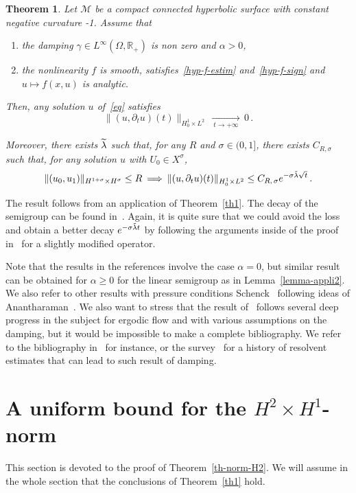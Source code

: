 \documentclass[10pt]{amsart}
\newtheorem{theo}{Theorem}[section]
\theoremstyle{definition}\newtheorem{defi}[theo]{Definition}\newtheorem{rema}[theo]{Remark}\newtheorem{exam}[theo]{Example}\newtheorem{exem}[theo]{Example}\newtheorem{nota}[theo]{Notation}
\newcommand{\RR}{\mathbb{R}}
\newcommand*{\alphenumi}{\renewcommand*{\theenumi}{\alph{enumi}}}
\let\oldtilde\tilde
\renewcommand*{\tilde}[1]{\mathchoice{\widetilde{#1}}{\widetilde{#1}}{\oldtilde{#1}}{\oldtilde{#1}}}\let\oldexists\exists
\renewcommand*{\exists}{\mathrel{\oldexists}}
\begin{document}
\begin{theo}\label{th-appli5}
Let $\mathcal{M}$ be a compact connected hyperbolic surface with constant negative curvature -1. Assume that
\begin{enumerate}\alphenumi
\item \label{listtheo12.1.1}the damping $\gamma\in L^\infty(\Omega,\RR_+)$ is non zero and $\alpha>0$,
\item \label{listtheo12.1.2}the nonlinearity $f$ is smooth, satisfies~\eqref{hyp-f-estim} and~\eqref{hyp-f-sign} and $u\mapsto f(x,u)$ is analytic.
\end{enumerate}

Then, any solution $u$ of~\eqref{eq} satisfies
\[
\|(u,\partial_t u)(t)\|_{H^1_0\times L^2}\,\xrightarrow[\:t\longrightarrow
+\infty\:]{}\,0\,.
\]

Moreover, there exists $\tilde\lambda$ such that, for any $R$ and $\sigma\in (0,1]$, there exists $C_{R,\sigma}$ such that, for any solution $u$ with $U_0\in X^\sigma$,
\[
\|(u_0,u_1)\|_{H^{1+\sigma}\times H^\sigma}\leq
R\:\Longrightarrow\:\|(u,\partial_t u)(t)\|_{H^1_0\times L^2} \leq
C_{R,\,\sigma}e^{-\sigma\tilde \lambda\sqrt{t}}\,.
\]
\end{theo}

The result follows from an application of Theorem~\ref{th1}. The decay of the semigroup can be found in~\cite{Lin}. Again, it is quite sure that we could avoid the loss and obtain a better decay $e^{-\sigma\tilde \lambda t}$ by following the arguments inside of the proof in~\cite{Lin} for a slightly modified operator.

Note that the results in the references involve the case $\alpha=0$, but similar result can be obtained for $\alpha\geq 0$ for the linear semigroup as in Lemma~\ref{lemma-appli2}. We also refer to other results with pressure conditions Schenck~\cite{Schenckpressure} following ideas of Anantharaman~\cite{Anant}. We also want to stress that the result of~\cite{Lin} follows several deep progress in the subject for ergodic flow and with various assumptions on the damping, but it would be impossible to make a complete bibliography. We refer to the bibliography in~\cite{Lin} for instance, or the survey~\cite{NonenmacherICM} for a history of resolvent estimates that can lead to such result of damping.



\section{A uniform bound for the \texorpdfstring{$H^2\times H^1$}{H2 x H1}-norm}\label{section-th-norm-H2}
This section is devoted to the proof of Theorem~\ref{th-norm-H2}. We will assume in the whole section that the conclusions of Theorem~\ref{th1} hold.
\end{document}
